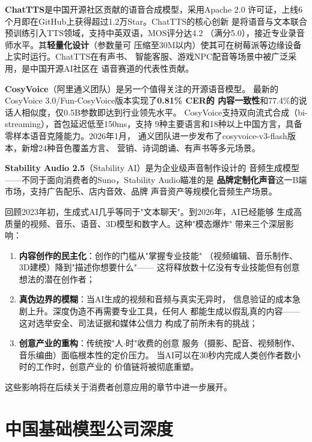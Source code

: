 \textbf{ChatTTS}是中国开源社区贡献的语音合成模型，采用Apache 2.0
许可证，上线6个月即在GitHub上获得超过1.2万Star。ChatTTS的核心创新
是将语音与文本联合预训练引入TTS领域，支持中英双语，MOS评分达4.2
（满分5.0），接近专业录音师水平。其\textbf{轻量化设计}（参数量可
压缩至30M以内）使其可在树莓派等边缘设备上实时运行。ChatTTS在有声书、
智能客服、游戏NPC配音等场景中被广泛采用，是中国开源AI社区在
语音赛道的代表性贡献。

\textbf{CosyVoice}（阿里通义团队）是另一个值得关注的开源语音模型。
最新的CosyVoice 3.0/Fun-CosyVoice版本实现了\textbf{0.81\% CER的
内容一致性}和77.4\%的说话人相似度，仅0.5B参数即达到行业领先水平。
CosyVoice支持双向流式合成（bi-streaming），首包延迟低至150ms，支持
9种主要语言和18种以上中国方言，具备零样本语音克隆能力。2026年1月，
通义团队进一步发布了cosyvoice-v3-flash版本，新增24种音色覆盖方言、
营销、诗词朗诵、有声书等多元场景。

\textbf{Stability Audio 2.5}（Stability AI）是为企业级声音制作设计的
音频生成模型——不同于面向消费者的Suno，Stability Audio瞄准的是
\textbf{品牌定制化声音}这一B端市场，支持广告配乐、店内音效、品牌
声音资产等规模化音频生产场景。

\begin{corebox}
回顾2023年初，生成式AI几乎等同于"文本聊天"。到2026年，AI已经能够
生成高质量的视频、音乐、语音、3D模型和数字人。这种"模态爆炸"
带来三个深层影响：
\begin{enumerate}
  \item \textbf{内容创作的民主化}：创作的门槛从"掌握专业技能"
    （视频编辑、音乐制作、3D建模）降到"描述你想要什么"——
    这将释放数十亿没有专业技能但有创意想法的潜在创作者；
  \item \textbf{真伪边界的模糊}：当AI生成的视频和音频与真实无异时，
    信息验证的成本急剧上升。深度伪造不再需要专业工具，任何人
    都能生成以假乱真的内容——这对选举安全、司法证据和媒体公信力
    构成了前所未有的挑战；
  \item \textbf{创意产业的重构}：传统按"人$\cdot$时"收费的创意
    服务（摄影、配音、视频制作、音乐编曲）面临根本性的定价压力。
    当AI可以在30秒内完成人类创作者数小时的工作时，创意产业的
    价值链将被彻底重塑。
\end{enumerate}
这些影响将在后续关于消费者创意应用的章节中进一步展开。
\end{corebox}


\section{中国基础模型公司深度}
\label{sec:models-china}

